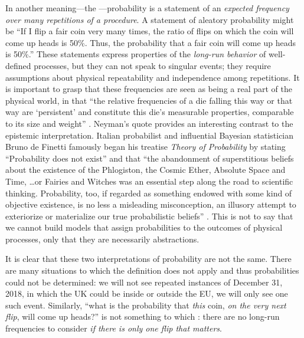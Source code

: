 In another meaning---the ---probability is a statement of an \emph{expected frequency over many repetitions of a procedure}. A statement {of aleatory probability} might be ``If I flip a fair coin very many times, the ratio of flips on which the coin will come up heads is 50\%. Thus, the probability that a fair coin will come up heads is 50\%.''  These statements express properties of the \emph{long-run behavior} of well-defined processes, but they can not speak to singular events; they require assumptions about physical repeatability and independence among repetitions. 
It is important to grasp that these frequencies are seen as being a real part of the physical world, in that ``the relative frequencies of a die falling this way or that way are `persistent' and constitute this die's measurable properties, comparable to its size and weight'' \cite[p.\ 99]{Neyman1977}. 
{Neyman's quote provides an interesting contrast to the epistemic interpretation. Italian probabilist and influential Bayesian statistician Bruno de Finetti famously began his treatise \textit{Theory of Probability} by stating ``Probability does not exist'' and that ``the abandonment of superstitious beliefs about the existence of the Phlogiston, the Cosmic Ether, Absolute Space and Time, \dots or Fairies and Witches was an essential step along the road to scientific thinking. Probability, too, if regarded as something endowed with some kind of objective existence, is no less a misleading misconception, an illusory attempt to exteriorize or materialize our true probabilistic beliefs'' \cite[p.\ x]{deFinetti1974}. This is not to say that we cannot build models that assign probabilities to the outcomes of physical processes, only that they are necessarily abstractions.}

It is clear that these two interpretations of probability are not the same. There are many situations to which the  definition does not apply and thus probabilities could not be determined: we will not see repeated instances of December 31, 2018, in which the UK could be inside or outside the EU, we will only see one such event. Similarly, ``what is the probability that \emph{this} coin, \emph{on the very next flip}, will come up heads?'' is not something to which : there are no long-run frequencies to consider \emph{if there is only one flip {that matters}}.

